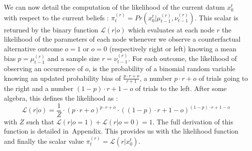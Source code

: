\documentclass[10pt,letterpaper]{article}
\newcommand{\eq}[1]{\begin{equation*}#1\end{equation*}}
\newcommand{\eql}[1]{\begin{equation}#1\end{equation}}
\newcommand{\Ll}{\mathcal{L}}
\newcommand{\seeApp}[1]{Appendix}
\begin{document}
We can now detail the computation of the likelihood of the current datum $x_0^{t}$ with respect to
the current beliefs : $\pi^{(r)}_t = Pr( x_0^{t} |  \mu^{(r)}_{t-1}, \nu^{(r)}_{t-1})$. %
This scalar is returned by the binary function
$\Ll(r | o)$ which evaluates at each node $r$ the likelihood of the parameters of each node
whenever we observe a counterfactual alternative outcome $o=1$ or $o=0$
(respectively right or left)
knowing a mean bias $p=\mu^{(r)}_{t-1}$
and a sample size $r=\nu^{(r)}_{t-1}$.
For each outcome, the likelihood of observing an occurrence of $o$,
is the probability of a binomial random variable knowing
an updated probability bias of $\frac{p \cdot r + o}{r+1}$,
a number $p \cdot r + o$ of trials going to the right and
a number $(1-p) \cdot r + 1 - o$ of trials to the left.
After some algebra, this defines the likelihood as :
\eql{
\Ll(r | o) = \frac{1}{Z} \cdot {(p \cdot r + o)}^{p \cdot r + o} \cdot {((1- p)\cdot r + 1- o)}^{(1- p)\cdot r + 1- o}
\label{eq:likelihood}
}
with $Z$ such that $\Ll(r | o=1) + \Ll(r | o=0)=1$. %
The full derivation of this function is detailed in~\seeApp{likelihood}.
This provides us with the likelihood function
and finally the scalar value $\pi^{(r)}_t = \Ll(r | x_0^{t})$.
\end{document}

